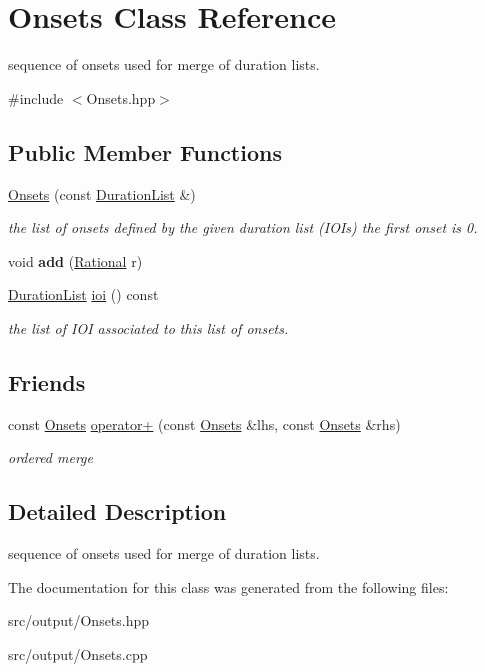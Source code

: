 \hypertarget{classOnsets}{}\section{Onsets Class Reference}
\label{classOnsets}


sequence of onsets used for merge of duration lists.  




{\ttfamily \#include $<$Onsets.\+hpp$>$}

\subsection*{Public Member Functions}
\begin{DoxyCompactItemize}
\item 
\mbox{\hyperlink{group__output_ga6a3bc246737b5cc48df0e07b36e9935f}{Onsets}} (const \mbox{\hyperlink{classDurationList}{Duration\+List}} \&)
\begin{DoxyCompactList}\small\item\em the list of onsets defined by the given duration list (I\+OI\textquotesingle{}s) the first onset is 0. \end{DoxyCompactList}\item 
\mbox{\label{classOnsets_a7cabc75f68a8d2e74d7356433a4964e5}} 
void {\bfseries add} (\mbox{\hyperlink{classRational}{Rational}} r)
\item 
\mbox{\hyperlink{classDurationList}{Duration\+List}} \mbox{\hyperlink{group__output_gad3393b6422e8708954e27a52933620e1}{ioi}} () const
\begin{DoxyCompactList}\small\item\em the list of I\+OI associated to this list of onsets. \end{DoxyCompactList}\end{DoxyCompactItemize}
\subsection*{Friends}
\begin{DoxyCompactItemize}
\item 
\mbox{\label{classOnsets_a42a2ffdfe358dcac1df9704c4179dfeb}} 
const \mbox{\hyperlink{classOnsets}{Onsets}} \mbox{\hyperlink{classOnsets_a42a2ffdfe358dcac1df9704c4179dfeb}{operator+}} (const \mbox{\hyperlink{classOnsets}{Onsets}} \&lhs, const \mbox{\hyperlink{classOnsets}{Onsets}} \&rhs)
\begin{DoxyCompactList}\small\item\em ordered merge \end{DoxyCompactList}\end{DoxyCompactItemize}


\subsection{Detailed Description}
sequence of onsets used for merge of duration lists. 

The documentation for this class was generated from the following files\+:\begin{DoxyCompactItemize}
\item 
src/output/Onsets.\+hpp\item 
src/output/Onsets.\+cpp\end{DoxyCompactItemize}
